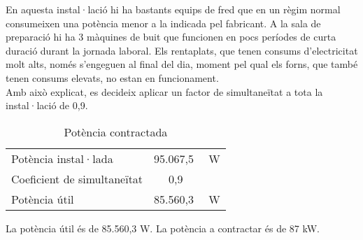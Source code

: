 \noindent En aquesta instal·lació hi ha bastants equips de fred que en un règim normal consumeixen una potència menor a la indicada pel fabricant. A la sala de preparació hi ha 3 màquines de buit que funcionen en pocs períodes de curta duració durant la jornada laboral. Els rentaplats, que tenen consums d'electricitat molt alts, només s'engeguen al final del dia, moment pel qual els forns, que també tenen consums elevats, no estan en funcionament. \\
\newline Amb això explicat, es decideix aplicar un factor de simultaneïtat a tota la instal·lació de 0,9.
%
\begin{table}[H]
\begin{center}
 \begin{tabular}{|l|r|}%
 \hline
  Potència instal·lada & 95.067,5 \ \ W \\
  Coeficient de simultaneïtat &  0,9 \ \ \ \ \ \  \\ 
 \hline
 Potència útil & 85.560,3 \ \ W\\
 \hline
 \end{tabular}
 \caption{Potència contractada}
\end{center}
\end{table}
%
\noindent La potència útil és de 85.560,3 W. La potència a contractar és de 87 kW.

\clearpage